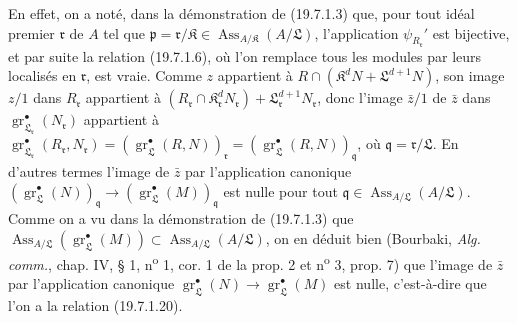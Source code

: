 En effet, on a noté, dans la démonstration de (19.7.1.3) que, pour tout idéal premier $\mathfrak r$ de $A$ tel que $\mathfrak p=\mathfrak r/\mathfrak K\in\operatorname{Ass}_{A/\mathfrak K}(A/\mathfrak L)$, l'application $\psi_{R_{\mathfrak r}}'$ est bijective, et par suite la relation (19.7.1.6), où l'on remplace tous les modules par leurs localisés en $\mathfrak r$, est vraie. Comme $z$ appartient à $R\cap(\mathfrak K^dN+\mathfrak L^{d+1}N)$, son image $z/1$ dans $R_{\mathfrak r}$ appartient à $(R_{\mathfrak r}\cap\mathfrak K_{\mathfrak r}^dN_{\mathfrak r})+\mathfrak L_{\mathfrak r}^{d+1}N_{\mathfrak r}$, donc l'image $\bar z/1$ de $\bar z$ dans $\operatorname{gr}_{\mathfrak L_{\mathfrak r}}^\bullet(N_{\mathfrak r})$ appartient à $\operatorname{gr}_{\mathfrak L_{\mathfrak r}}^\bullet(R_{\mathfrak r},N_{\mathfrak r})=(\operatorname{gr}_{\mathfrak L}^\bullet(R,N))_{\mathfrak r}=(\operatorname{gr}_{\mathfrak L}^\bullet(R,N))_{\mathfrak q}$, où $\mathfrak q=\mathfrak r/\mathfrak L$. En d'autres termes l'image de $\bar z$ par l'application canonique $(\operatorname{gr}_{\mathfrak L}^\bullet(N))_{\mathfrak q}\longrightarrow(\operatorname{gr}_{\mathfrak L}^\bullet(M))_{\mathfrak q}$ est nulle pour tout $\mathfrak q\in\operatorname{Ass}_{A/\mathfrak L}(A/\mathfrak L)$. Comme on a vu dans la démonstration de (19.7.1.3) que $\operatorname{Ass}_{A/\mathfrak L}(\operatorname{gr}_{\mathfrak L}^\bullet(M))\subset\operatorname{Ass}_{A/\mathfrak L}(A/\mathfrak L)$, on en déduit bien (Bourbaki, \emph{Alg. comm.}, chap. IV, § 1, n\textsuperscript{o} 1, cor. 1 de la prop. 2 et n\textsuperscript{o} 3, prop. 7) que l'image de $\bar z$ par l'application canonique $\operatorname{gr}_{\mathfrak L}^\bullet(N)\to\operatorname{gr}_{\mathfrak L}^\bullet(M)$ est nulle, c'est-à-dire que l'on a la relation (19.7.1.20).

